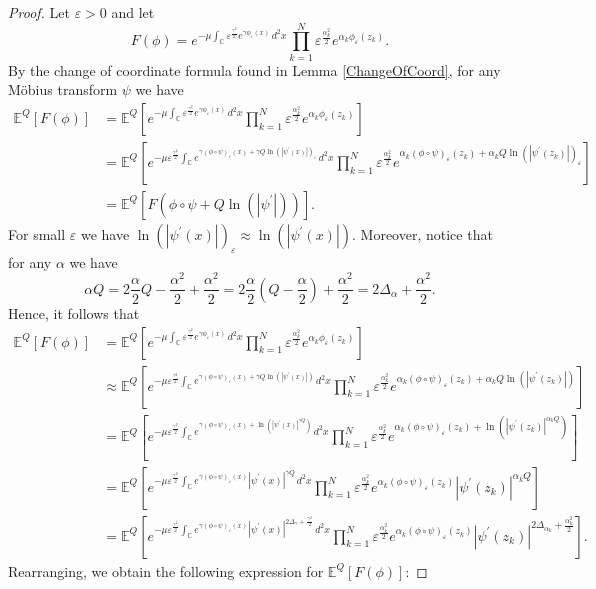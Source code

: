 \documentclass[reqno]{amsart}
\newcommand{\idd}[4]{\int_{#1}^{#2}#3\,d^2#4}
\newcommand{\p}{\prime}
\renewcommand{\l}{\left}
\renewcommand{\r}{\right}
\newcommand{\C}{\mathbb{C}}
\newcommand{\E}{\mathbb{E}}
\renewcommand{\a}{\alpha}
\renewcommand{\epsilon}{\varepsilon}
\newcommand{\e}{\epsilon}
\theoremstyle{definition}
\begin{document}
\begin{proof}
Let $\e>0$ and let
\[F(\phi)=e^{-\mu\idd{\C}{}{\e^{\frac{\gamma^2}{2}}e^{\gamma\phi_\e(x)}}{x}}\prod_{k=1}^N\e^{\frac{\a_k^2}{2}}e^{\a_k\phi_\e(z_k)}.\]
By the change of coordinate formula found in Lemma \ref{ChangeOfCoord}, for any M\"obius transform $\psi$ we have
\begin{align*}
\E^Q[F(\phi)]
&=\E^Q\l[e^{-\mu\idd{\C}{}{\e^{\frac{\gamma^2}{2}}e^{\gamma\phi_\e(x)}}{x}}\prod_{k=1}^N\e^{\frac{\a_k^2}{2}}e^{\a_k\phi_\e(z_k)}\r]\\
&=\E^Q\l[e^{-\mu\e^{\frac{\gamma^2}{2}}\idd{\C}{}{e^{\gamma(\phi\circ\psi)_\e(x)+\gamma Q\ln(|\psi^\p(x)|)_\e}}{x}}\prod_{k=1}^N\e^{\frac{\a_k^2}{2}}e^{\a_k(\phi\circ\psi)_\e(z_k)+\a_kQ\ln(|\psi^\p(z_k)|)_\e}\r]\\
&=\E^Q[F(\phi\circ\psi+Q\ln(|\psi^\p|))].
\end{align*}
For small $\e$ we have $\ln(|\psi^\p(x)|)_\e\approx\ln(|\psi^\p(x)|)$. Moreover, notice that for any $\a$ we have
\[\a Q=2\frac{\a}{2}Q-\frac{\a^2}{2}+\frac{\a^2}{2}=2\frac{\a}{2}\l(Q-\frac{\a}{2}\r)+\frac{\a^2}{2}=2\Delta_\a+\frac{\a^2}{2}.\]
Hence, it follows that
\begin{align*}
\E^Q[F(\phi)]
&=\E^Q\l[e^{-\mu\idd{\C}{}{\e^{\frac{\gamma^2}{2}}e^{\gamma\phi_\e(x)}}{x}}\prod_{k=1}^N\e^{\frac{\a_k^2}{2}}e^{\a_k\phi_\e(z_k)}\r]\\
&\approx\E^Q\l[e^{-\mu\e^{\frac{\gamma^2}{2}}\idd{\C}{}{e^{\gamma(\phi\circ\psi)_\e(x)+\gamma Q\ln(|\psi^\p(x)|)}}{x}}\prod_{k=1}^N\e^{\frac{\a_k^2}{2}}e^{\a_k(\phi\circ\psi)_\e(z_k)+\a_kQ\ln(|\psi^\p(z_k)|)}\r]\\
&=\E^Q\l[e^{-\mu\e^{\frac{\gamma^2}{2}}\idd{\C}{}{e^{\gamma(\phi\circ\psi)_\e(x)+\ln(|\psi^\p(x)|^{\gamma Q})}}{x}}\prod_{k=1}^N\e^{\frac{\a_k^2}{2}}e^{\a_k(\phi\circ\psi)_\e(z_k)+\ln(|\psi^\p(z_k)|^{\a_kQ})}\r]\\
&=\E^Q\l[e^{-\mu\e^{\frac{\gamma^2}{2}}\idd{\C}{}{e^{\gamma(\phi\circ\psi)_\e(x)}|\psi^\p(x)|^{\gamma Q}}{x}}\prod_{k=1}^N\e^{\frac{\a_k^2}{2}}e^{\a_k(\phi\circ\psi)_\e(z_k)}|\psi^\p(z_k)|^{\a_kQ}\r]\\
&=\E^Q\l[e^{-\mu\e^{\frac{\gamma^2}{2}}\idd{\C}{}{e^{\gamma(\phi\circ\psi)_\e(x)}|\psi^\p(x)|^{2\Delta_\gamma+\frac{\gamma^2}{2}}}{x}}\prod_{k=1}^N\e^{\frac{\a_k^2}{2}}e^{\a_k(\phi\circ\psi)_\e(z_k)}|\psi^\p(z_k)|^{2\Delta_{\a_k}+\frac{\a_k^2}{2}}\r].
\end{align*}
Rearranging, we obtain the following expression for $\E^Q[F(\phi)]$:
\begingroup\makeatletter\def\f@size{9.5}\check@mathfonts

\end{proof}
\end{document}
